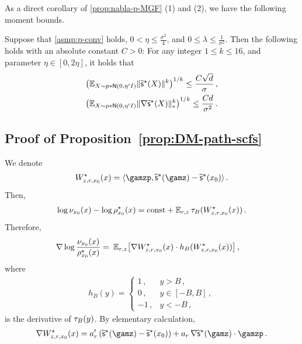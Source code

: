 As a direct corollary of \cref{prop:nabla-p-MGF} (1) and (2), we have the following moment bounds.

\begin{lemma}\label{lem:scfs-moments}
Suppose that \cref{asmp:p-conv} holds, $0<\eta\leq \frac{\sigma^2}{4}$, and $0\leq \lambda\leq \frac{1}{\sigma^2}$. Then the following holds with an absolute constant $C>0$: For any integer $1\leq k\leq 16$, and parameter $\eta\in[0,2\eta]$, it holds that
\begin{align*}
    \prn*{ \En_{X\sim \pconv{\eta'}}\nrm{\tscfs(X)}^{k} }^{1/k}\leq \frac{C\sqrt{d}}{\sigma}\,, \\
    \prn*{ \En_{X\sim \pconv{\eta'}}\nrmnuc{\nabla \tscfs(X)}^{k} }^{1/k}\leq \frac{Cd}{\sigma^2}\,.
\end{align*}
\end{lemma}


\subsection{Proof of Proposition~\ref{prop:DM-path-scfs}}\label{appdx:pf-DM-path-scfs}


We denote
\begin{align*}
    \epsxz=\tri{\gamzp,\tscfs(\gamz)-\tscfs(\xz)}\,.
\end{align*}
Then, 
\begin{align*}
    \log \piz{x}-\log \rhosz{x}=\const+\En_{\lr,z}\trunc[\B]{\epsxz}\,.
\end{align*}
Therefore,
\begin{align*}
    \nabla \log \frac{\piz{x}}{\rhosz{x}}
    =&~ \En_{\lr,z}\brk*{ \nabla \epsxz \cdot h_B(\epsxz)}\,, 
\end{align*}
where
\begin{align*}
h_B(y)=\begin{cases}
    1\,, & y>B\,,\\
    0\,, &y\in[-B,B]\,,\\
    -1\,, &y<-B\,,
\end{cases}
\end{align*}
is the derivative of $\trunc{y}$.
By elementary calculation,
\begin{align*}
    \nabla \epsxz=\alrp\, (\tscfs(\gamz)-\tscfs(\xz))+\alr\, \nabla \tscfs(\gamz) \cdot \gamzp\,.
\end{align*}

